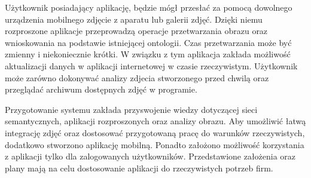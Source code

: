 Użytkownik posiadający aplikację, będzie mógł przesłać za pomocą dowolnego urządzenia mobilnego zdjęcie z aparatu lub galerii zdjęć. Dzięki niemu rozproszone aplikacje przeprowadzą operacje przetwarzania obrazu oraz wnioskowania na podstawie istniejącej ontologii. Czas przetwarzania może być zmienny i niekoniecznie krótki. W związku z tym aplikacja zakłada możliwość aktualizacji danych w aplikacji internetowej w czasie rzeczywistym. Użytkownik może zarówno dokonywać analizy zdjecia stworzonego przed chwilą oraz przeglądać archiwum dostępnych zdjęć w programie.

Przygotowanie systemu zakłada przyswojenie wiedzy dotyczącej sieci semantycznych, aplikacji rozproszonych oraz analizy obrazu. Aby umożliwić łatwą integrację zdjęć oraz dostosować przygotowaną pracę do warunków rzeczywistych, dodatkowo stworzono aplikację mobilną. Ponadto założono możliwość korzystania z aplikacji tylko dla zalogowanych użytkowników. Przedstawione założenia oraz plany mają na celu dostosowanie aplikacji do rzeczywistych potrzeb firm.